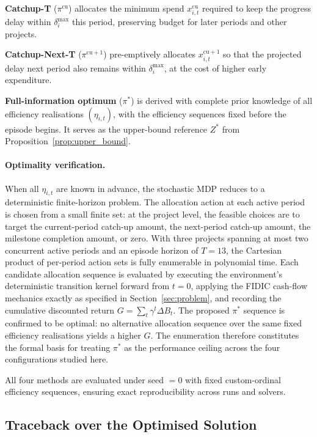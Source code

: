 \textbf{Catchup-T} ($\pi^{\mathrm{cu}}$) allocates the minimum spend
$x^{\mathrm{cu}}_{i,t}$ required to keep the progress delay within
$\delta^{\max}_i$ this period, preserving budget for later periods
and other projects.

\textbf{Catchup-Next-T} ($\pi^{\mathrm{cu}+1}$) pre-emptively
allocates $x^{\mathrm{cu}+1}_{i,t}$ so that the projected delay next
period also remains within $\delta^{\max}_i$, at the cost of higher
early expenditure.

\textbf{Full-information optimum} ($\pi^*$) is derived with complete
prior knowledge of all efficiency realisations $(\eta_{i,t})$, with
the efficiency sequences fixed before the episode begins. It serves as
the upper-bound reference $Z^*$ from Proposition~\ref{prop:upper_bound}.

\paragraph{Optimality verification.}
When all $\eta_{i,t}$ are known in advance, the stochastic MDP reduces
to a deterministic finite-horizon problem. The allocation action at
each active period is chosen from a small finite set: at the
project level, the feasible choices are to target the current-period
catch-up amount, the next-period catch-up amount, the milestone
completion amount, or zero. With three projects spanning at most two
concurrent active periods and an episode horizon of $T = 13$, the
Cartesian product of per-period action sets is fully enumerable in
polynomial time. Each candidate allocation sequence is evaluated by
executing the environment's deterministic transition kernel forward
from $t = 0$, applying the FIDIC cash-flow mechanics exactly as
specified in Section~\ref{sec:problem}, and recording the cumulative
discounted return $G = \sum_{t} \gamma^t \Delta B_t$. The proposed
$\pi^*$ sequence is confirmed to be optimal: no alternative allocation
sequence over the same fixed efficiency realisations yields a higher
$G$. The enumeration therefore constitutes the formal basis for
treating $\pi^*$ as the performance ceiling across the four
configurations studied here.

All four methods are evaluated under seed $= 0$ with fixed
custom-ordinal efficiency sequences, ensuring exact reproducibility
across runs and solvers.

\subsection{Traceback over the Optimised Solution}
\label{subsec:traceback}


